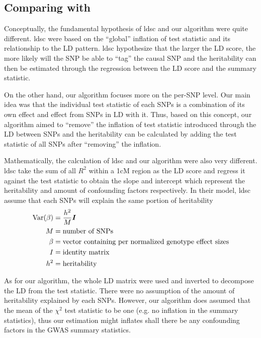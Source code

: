 		\subsection{Comparing with }
			Conceptually, the fundamental hypothesis of \gls{ldsc} and our algorithm were quite different.
			\gls{ldsc} were based on the ``global'' inflation of test statistic and its relationship to the \gls{LD} pattern.
			\gls{ldsc} hypothesize that the larger the \gls{LD} score, the more likely will the \gls{SNP} be able to ``tag'' the causal \gls{SNP} and the heritability can then be estimated through the regression between the \gls{LD} score and the summary statistic.
			
			On the other hand, our algorithm focuses more on the per-\gls{SNP} level.
			Our main idea was that the individual test statistic of each \glspl{SNP} is a combination of its own effect and effect from \glspl{SNP} in \gls{LD} with it. 
			Thus, based on this concept, our algorithm aimed to ``remove'' the inflation of test statistic introduced through the \gls{LD} between \glspl{SNP} and the heritability can be calculated by adding the test statistic of all \glspl{SNP} after ``removing'' the inflation. 
			
			Mathematically, the calculation of \gls{ldsc} and our algorithm were also very different. 
			\gls{ldsc} take the sum of all $R^2$ within a 1cM region as the LD score and regress it against the test statistic to obtain the slope and intercept which represent the heritability and amount of confounding factors respectively. 
			In their model, \gls{ldsc} assume that each \glspl{SNP} will explain the same portion of heritability
			\begin{align}
			 \mathrm{Var}(\beta)&=\frac{h^2}{M}\boldsymbol{I}\\
			 M &= \text{number of SNPs}\notag\\
			 \beta &= \text{vector containing per normalized genotype effect sizes}\notag\\
			 I &= \text{identity matrix}\notag\\
			 h^2 &= \text{heritability}\notag
			\end{align}
			
			As for our algorithm, the whole \gls{LD} matrix were used and inverted to decompose the \gls{LD} from the test statistic. 
			There were no assumption of the amount of heritability explained by each \glspl{SNP}. 
			However, our algorithm does assumed that the mean of the $\chi^2$ test statistic to be one (e.g. no inflation in the summary statistics), thus our estimation might inflates shall there be any confounding factors in the \gls{GWAS} summary statistics.
			
